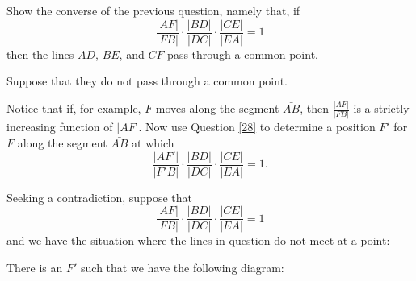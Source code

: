 \documentclass{ximera}
\begin{document}
\begin{question}
Show the converse of the previous question, namely that, if%
\[
\frac{|AF|}{|FB|}\cdot\frac{|BD|}{|DC|}\cdot\frac{|CE|}{|EA|}=1
\]
then the lines $AD$, $BE$, and $CF$ pass through a common point.
\begin{solution}
\begin{hint}
Suppose that they do not pass through a common point.
\begin{image}
\end{image}
\end{hint}
\begin{hint}
Notice that if, for example, $F$ moves along the segment $\bar{AB}$,
then $\frac{|AF|}{|FB|}$ is a strictly increasing function of
$|AF|$. Now use Question \ref{28} to determine a position $F'$ for $F$
along the segment $\bar{AB}$ at which
\[
\frac{|AF'|}{|F'B|}\cdot\frac{|BD|}{|DC|}\cdot\frac{|CE|}{|EA|}=1.
\]
\end{hint}
\begin{freeResponse}
Seeking a contradiction, suppose that 
\[
\frac{|AF|}{|FB|}\cdot\frac{|BD|}{|DC|}\cdot\frac{|CE|}{|EA|}=1
\]
and we have the situation where the lines in question do not meet at a point:
\begin{image}
\end{image}
There is an $F'$ such that we have the following diagram:
\begin{image}
\end{image}
\end{freeResponse}
\end{solution}
\end{question}
\end{document}
